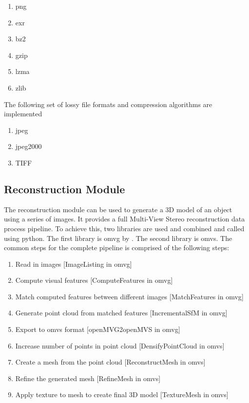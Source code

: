 \begin{enumerate}
    \item png
    \item exr
    \item bz2
    \item gzip
    \item lzma
    \item zlib
\end{enumerate}

The following set of lossy file formats and compression algorithms are implemented

\begin{enumerate}
    \item jpeg
    \item jpeg2000
    \item TIFF
\end{enumerate}

\subsection{Reconstruction Module}
The reconstruction module can be used to generate a 3D model of an object using a series of images. It provides a full Multi-View Stereo reconstruction data process pipeline. To achieve this, two libraries are used and combined and called using python. The first library is \gls{omvg} by \cite{openMVG}. The second library is \gls{omvs}. 
The common steps for the complete pipeline is comprised of the following steps:
\begin{enumerate}
    \item Read in images [ImageListing in \gls{omvg}]
    \item Compute visual features [ComputeFeatures in \gls{omvg}]
    \item Match computed features between different images [MatchFeatures in \gls{omvg}]
    \item Generate point cloud from matched features [IncrementalSfM in \gls{omvg}]
    \item Export to \gls{omvs} format [openMVG2openMVS in \gls{omvg}]
    \item Increase number of points in point cloud [DensifyPointCloud in \gls{omvs}]
    \item Create a mesh from the point cloud [ReconstructMesh in \gls{omvs}]
    \item Refine the generated mesh [RefineMesh in \gls{omvs}]
    \item Apply texture to mesh to create final 3D model [TextureMesh in \gls{omvs}]
\end{enumerate}

